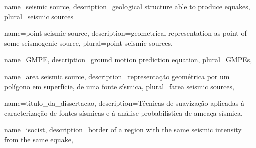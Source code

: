 {
	name={seismic source},
	description={geological structure able to produce \glspl{equake}},
	plural={seismic sources}
}

{
	name={point seismic source},
	description={geometrical representation as point of some seismogenic source},
	plural={point seismic sources},
}

{
	name={GMPE},
	description={ground motion prediction equation},
	plural={GMPEs},
}


{
	name={area seismic source},
	description={representação geométrica por um polígono em superfície, 
				 de uma fonte sísmica},
	plural={farea seismic sources},
}

{
	name={titulo_da_dissertacao},
	description={Técnicas de suavização aplicadas
					à caracterização de fontes sísmicas e 
					à análise probabilística de ameaça sísmica},
}

{
	name={isocist},
	description={border of a region with the same seismic intensity from the same \gls{equake}},
}


